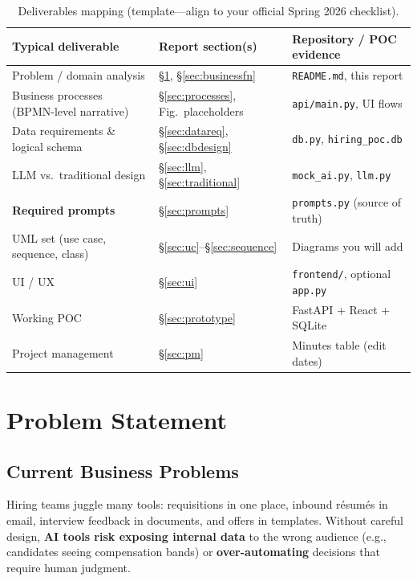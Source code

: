 \documentclass[12pt]{article}
\begin{document}
\begin{table}[H]
\centering
\begin{tabular}{p{4.6cm}p{5.2cm}p{5.5cm}}
\toprule
\textbf{Typical deliverable} & \textbf{Report section(s)} & \textbf{Repository / POC evidence} \\
\midrule
Problem / domain analysis & \S\ref{sec:problem}, \S\ref{sec:businessfn} & \texttt{README.md}, this report \\
Business processes (BPMN-level narrative) & \S\ref{sec:processes}, Fig.\ placeholders & \texttt{api/main.py}, UI flows \\
Data requirements \& logical schema & \S\ref{sec:datareq}, \S\ref{sec:dbdesign} & \texttt{db.py}, \texttt{hiring\_poc.db} \\
LLM vs.\ traditional design & \S\ref{sec:llm}, \S\ref{sec:traditional} & \texttt{mock\_ai.py}, \texttt{llm.py} \\
\textbf{Required prompts} & \S\ref{sec:prompts} & \texttt{prompts.py} (source of truth) \\
UML set (use case, sequence, class) & \S\ref{sec:uc}--\S\ref{sec:sequence} & Diagrams you will add \\
UI / UX & \S\ref{sec:ui} & \texttt{frontend/}, optional \texttt{app.py} \\
Working POC & \S\ref{sec:prototype} & FastAPI + React + SQLite \\
Project management & \S\ref{sec:pm} & Minutes table (edit dates) \\
\bottomrule
\end{tabular}
\caption{Deliverables mapping (template---align to your official Spring 2026 checklist).}
\label{tab:deliverables}
\end{table}

\section{Problem Statement}
\label{sec:problem}

\subsection{Current Business Problems}

Hiring teams juggle many tools: requisitions in one place, inbound résumés in email, interview feedback in documents, and offers in templates. Without careful design, \textbf{AI tools risk exposing internal data} to the wrong audience (e.g., candidates seeing compensation bands) or \textbf{over-automating} decisions that require human judgment.
\end{document}
